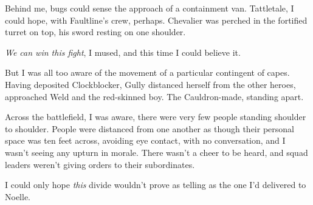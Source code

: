 Behind me, bugs could sense the approach of a containment van.  Tattletale, I could hope, with Faultline's crew, perhaps.  Chevalier was perched in the fortified turret on top, his sword resting on one shoulder.



\emph{We can win this fight}, I mused, and this time I could believe it.



But I was all too aware of the movement of a particular contingent of capes.  Having deposited Clockblocker, Gully distanced herself from the other heroes, approached Weld and the red-skinned boy.  The Cauldron-made, standing apart.



Across the battlefield, I was aware, there were very few people standing shoulder to shoulder.  People were distanced from one another as though their personal space was ten feet across, avoiding eye contact, with no conversation, and I wasn't seeing any upturn in morale.  There wasn't a cheer to be heard, and squad leaders weren't giving orders to their subordinates.



I could only hope \emph{this} divide wouldn't prove as telling as the one I'd delivered to Noelle.





